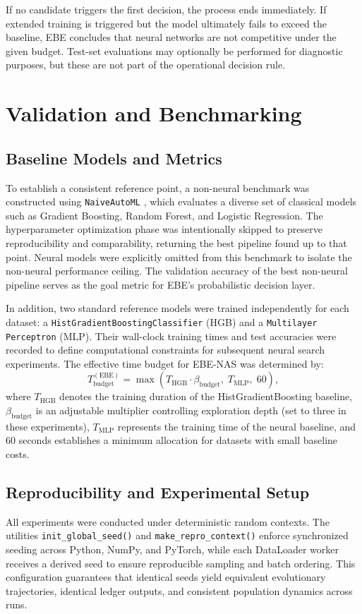 \documentclass[stu,12pt,floatsintext,doublespacing]{apa7}
\begin{document}
If no candidate triggers the first decision, the process ends immediately. If extended training is triggered but the model ultimately fails to exceed the baseline, EBE concludes that neural networks are not competitive under the given budget. Test-set evaluations may optionally be performed for diagnostic purposes, but these are not part of the operational decision rule.

\section{Validation and Benchmarking}
\label{sec:validation}

\subsection{Baseline Models and Metrics}
To establish a consistent reference point, a non-neural benchmark was constructed using \texttt{NaiveAutoML} \parencite{Mohr2023NaiveLearning}, which evaluates a diverse set of classical models such as Gradient Boosting, Random Forest, and Logistic Regression. The hyperparameter optimization phase was intentionally skipped to preserve reproducibility and comparability, returning the best pipeline found up to that point. Neural models were explicitly omitted from this benchmark to isolate the non-neural performance ceiling.  
The validation accuracy of the best non-neural pipeline serves as the goal metric for EBE’s probabilistic decision layer.

In addition, two standard reference models were trained independently for each dataset: a \texttt{HistGradientBoostingClassifier} (HGB) and a \texttt{Multilayer Perceptron} (MLP). Their wall-clock training times and test accuracies were recorded to define computational constraints for subsequent neural search experiments. The effective time budget for EBE-NAS was determined by:
\[
T_{\mathrm{budget}}^{(\mathrm{EBE})}
= \max \!\left(
    T_{\mathrm{HGB}} \cdot \beta_{\mathrm{budget}},\;
    T_{\mathrm{MLP}},\;
    60
\right),
\]
where $T_{\mathrm{HGB}}$ denotes the training duration of the HistGradientBoosting baseline, $\beta_{\mathrm{budget}}$ is an adjustable multiplier controlling exploration depth (set to three in these experiments), $T_{\mathrm{MLP}}$ represents the training time of the neural baseline, and $60$ seconds establishes a minimum allocation for datasets with small baseline costs.

\subsection{Reproducibility and Experimental Setup}
All experiments were conducted under deterministic random contexts. The utilities \texttt{init\_global\_seed()} and \texttt{make\_repro\_context()} enforce synchronized seeding across Python, NumPy, and PyTorch, while each DataLoader worker receives a derived seed to ensure reproducible sampling and batch ordering. This configuration guarantees that identical seeds yield equivalent evolutionary trajectories, identical ledger outputs, and consistent population dynamics across runs.
\end{document}
